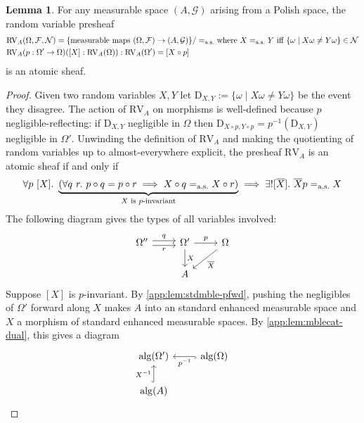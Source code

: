 \documentclass[
  sigconf,
  screen, ]{acmart}
\theoremstyle{definition}
\newtheorem{lemma}[theorem]{Lemma}
\newcommand\calF{\mathcal F}
\newcommand\calG{\mathcal G}
\newcommand\calN{\mathcal N}
\newcommand\aseq{=_{\rm a.s.}}
\newcommand\neset[2]{\mathrm{D}_{#1,#2}}
\newcommand\RV{\mathrm{RV}}
\begin{document}
\begin{lemma} \label{app:lem:rv-mble-sheaf}
  For any measurable space $(A,\calG)$
  arising from a Polish space, the random variable presheaf
  \begin{align*}
    &\RV_A(\Omega,\calF,\calN) = \{ \text{measurable maps }(\Omega,\calF)\to (A,\calG) \}/\aseq
    \text{where $X\aseq Y$ iff $\{\omega \mid X\omega\ne Y\omega\}\in\calN$}
    \\
    &\RV_A(p : \Omega' \to \Omega)([X] : \RV_A(\Omega)) : \RV_A(\Omega') = [X\circ p]
  \end{align*}
  is an atomic sheaf.
\end{lemma}
\begin{proof}
  Given two random variables $X,Y$ let $\neset X Y := \{\omega \mid X\omega\ne Y\omega\}$
  be the event they disagree.
  The action of $\RV_A$ on morphisms is well-defined because $p$
  negligible-reflecting: if $\neset{X}{Y}$ negligible in $\Omega$
  then $\neset{X\circ p}{Y\circ p} = p^{-1}(\neset X{Y})$ negligible in $\Omega'$.
  Unwinding the definition of $\RV_A$ and making the quotienting
  of random variables up to almost-everywhere explicit,
  the presheaf $\RV_A$ is an atomic sheaf
  if and only if
  \[
    \forall p~[X].~\underbrace{(\forall q~r.~ p\circ q = p\circ r \implies X\circ q \aseq X\circ r)}_{\text{$X$ is $p$-invariant}}
    \implies \exists! [\overline X].~ \overline X p \aseq X
  \]
  The following diagram gives the types of all variables involved:
\[\begin{tikzcd}
  \Omega'' \arrow[r, "r"', shift right=1] \arrow[r, "q", shift left=1] & \Omega' \arrow[r, "p"] \arrow[d, "X"] & \Omega \arrow[ld, "\overline X"] \\
                                                                       & A                                     &                                 
  \end{tikzcd}\]
  Suppose $[X]$ is $p$-invariant.
  By \cref{app:lem:stdmble-pfwd},
  pushing the negligibles of $\Omega'$ forward along $X$ 
  makes $A$ into an standard enhanced measurable space and $X$ a morphism of
  standard enhanced measurable spaces.
  By \cref{app:lem:mblecat-dual},
  this gives a diagram
\[\begin{tikzcd}
    \mathrm{alg}(\Omega')                     & \mathrm{alg}(\Omega) \arrow[l, "p^{-1}", hook] \\
    \mathrm{alg}(A) \arrow[u, "X^{-1}", hook] &                                               
    \end{tikzcd}\]

\end{proof}
\end{document}
